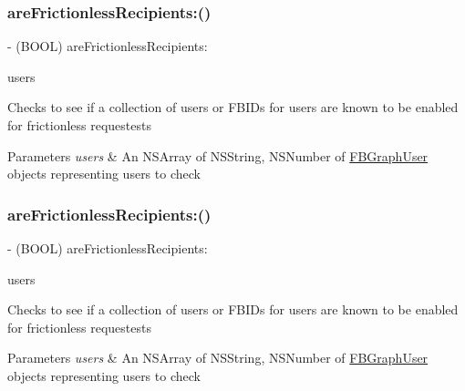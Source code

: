 \subsubsection{\texorpdfstring{are\+Frictionless\+Recipients\+:()}{areFrictionlessRecipients:()}\hspace{0.1cm}{\footnotesize\ttfamily [4/5]}}
{\footnotesize\ttfamily -\/ (B\+O\+OL) are\+Frictionless\+Recipients\+: \begin{DoxyParamCaption}\item[{(N\+S\+Array $\ast$)}]{users }\end{DoxyParamCaption}}

Checks to see if a collection of users or F\+B\+I\+Ds for users are known to be enabled for frictionless requestests


\begin{DoxyParams}{Parameters}
{\em users} & An N\+S\+Array of N\+S\+String, N\+S\+Number of {\ttfamily \hyperlink{protocolFBGraphUser-p}{F\+B\+Graph\+User}} objects representing users to check \\
\hline
\end{DoxyParams}
\mbox{\label{interfaceFBFrictionlessRecipientCache_a8a6dcc263fb784a4a00fcd37a6a47ca6}} 
\subsubsection{\texorpdfstring{are\+Frictionless\+Recipients\+:()}{areFrictionlessRecipients:()}\hspace{0.1cm}{\footnotesize\ttfamily [5/5]}}
{\footnotesize\ttfamily -\/ (B\+O\+OL) are\+Frictionless\+Recipients\+: \begin{DoxyParamCaption}\item[{(N\+S\+Array $\ast$)}]{users }\end{DoxyParamCaption}}

Checks to see if a collection of users or F\+B\+I\+Ds for users are known to be enabled for frictionless requestests


\begin{DoxyParams}{Parameters}
{\em users} & An N\+S\+Array of N\+S\+String, N\+S\+Number of {\ttfamily \hyperlink{protocolFBGraphUser-p}{F\+B\+Graph\+User}} objects representing users to check \\
\hline
\end{DoxyParams}
\mbox{\label{interfaceFBFrictionlessRecipientCache_a9d03bd8dd9a235086cab18ab45b143cd}} 
